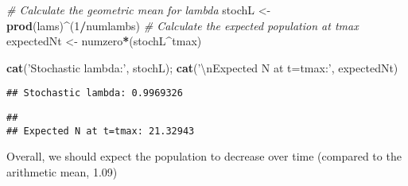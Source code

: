 \documentclass[]{article}
\newenvironment{Shaded}{\begin{snugshade}}{\end{snugshade}}
\newcommand{\KeywordTok}[1]{\textcolor[rgb]{0.13,0.29,0.53}{\textbf{#1}}}
\newcommand{\DecValTok}[1]{\textcolor[rgb]{0.00,0.00,0.81}{#1}}
\newcommand{\CharTok}[1]{\textcolor[rgb]{0.31,0.60,0.02}{#1}}
\newcommand{\StringTok}[1]{\textcolor[rgb]{0.31,0.60,0.02}{#1}}
\newcommand{\CommentTok}[1]{\textcolor[rgb]{0.56,0.35,0.01}{\textit{#1}}}
\newcommand{\OperatorTok}[1]{\textcolor[rgb]{0.81,0.36,0.00}{\textbf{#1}}}
\newcommand{\NormalTok}[1]{#1}
\begin{document}
\begin{Shaded}
\begin{Highlighting}[]
\CommentTok{# Calculate the geometric mean for lambda}
\NormalTok{stochL <-}\StringTok{ }\KeywordTok{prod}\NormalTok{(lams)}\OperatorTok{^}\NormalTok{(}\DecValTok{1}\OperatorTok{/}\NormalTok{numlambs)}
\CommentTok{# Calculate the expected population at tmax}
\NormalTok{expectedNt <-}\StringTok{ }\NormalTok{numzero}\OperatorTok{*}\NormalTok{(stochL}\OperatorTok{^}\NormalTok{tmax)}

\KeywordTok{cat}\NormalTok{(}\StringTok{'Stochastic lambda:'}\NormalTok{, stochL); }\KeywordTok{cat}\NormalTok{(}\StringTok{'}\CharTok{\textbackslash{}n}\StringTok{Expected N at t=tmax:'}\NormalTok{, expectedNt) }
\end{Highlighting}
\end{Shaded}

\begin{verbatim}
## Stochastic lambda: 0.9969326
\end{verbatim}

\begin{verbatim}
## 
## Expected N at t=tmax: 21.32943
\end{verbatim}

Overall, we should expect the population to decrease over time (compared
to the arithmetic mean, 1.09)
\end{document}
